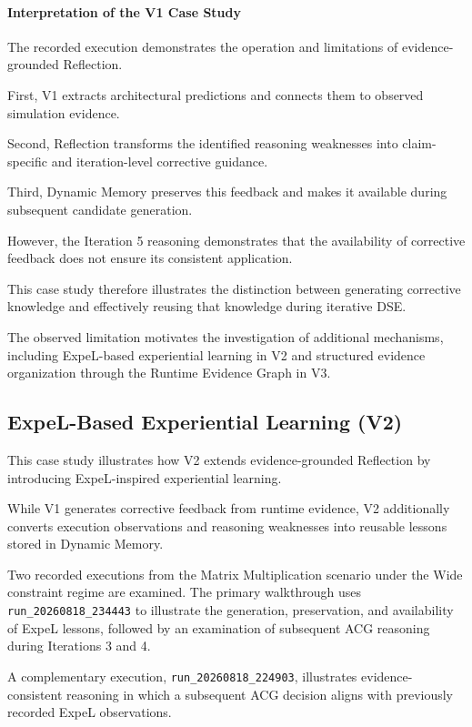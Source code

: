 \paragraph{Interpretation of the V1 Case Study}

The recorded execution demonstrates the
operation and limitations of evidence-grounded
Reflection.

First, V1 extracts architectural predictions
and connects them to observed simulation
evidence.

Second, Reflection transforms the identified
reasoning weaknesses into claim-specific
and iteration-level corrective guidance.

Third, Dynamic Memory preserves this feedback
and makes it available during subsequent
candidate generation.

However, the Iteration 5 reasoning demonstrates
that the availability of corrective feedback
does not ensure its consistent application.

This case study therefore illustrates
the distinction between generating corrective
knowledge and effectively reusing that
knowledge during iterative DSE.

The observed limitation motivates the
investigation of additional mechanisms,
including ExpeL-based experiential learning
in V2 and structured evidence organization
through the Runtime Evidence Graph in V3.




\subsection{ExpeL-Based Experiential Learning (V2)}
\label{app:p4_v2_case_study}

This case study illustrates how V2 extends
evidence-grounded Reflection by introducing
ExpeL-inspired experiential learning.

While V1 generates corrective feedback from
runtime evidence, V2 additionally converts
execution observations and reasoning weaknesses
into reusable lessons stored in Dynamic Memory.


Two recorded executions from the Matrix
Multiplication scenario under the Wide constraint
regime are examined. The primary walkthrough
uses \texttt{run\_20260818\_234443} to illustrate
the generation, preservation, and availability
of ExpeL lessons, followed by an examination
of subsequent ACG reasoning during Iterations
3 and 4.

A complementary execution,
\texttt{run\_20260818\_224903}, illustrates
evidence-consistent reasoning in which a
subsequent ACG decision aligns with previously
recorded ExpeL observations.

